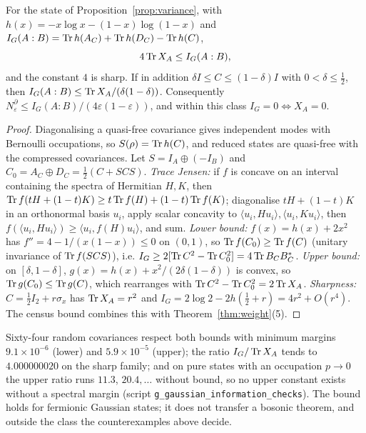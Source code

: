 \begin{theorem}\label{thm:info}
For the state of Proposition~\ref{prop:variance}, with $h(x)=-x\log x-(1-x)\log(1-x)$ and $I_G(A:B)=\operatorname{Tr} h(A_C)+\operatorname{Tr} h(D_C)-\operatorname{Tr} h(C)$,
\[
4\operatorname{Tr} X_A\le I_G(A:B),
\]
and the constant $4$ is sharp. If in addition $\delta I\le C\le(1-\delta)I$ with $0<\delta\le\tfrac12$, then $I_G(A:B)\le\operatorname{Tr} X_A/(\delta(1-\delta))$. Consequently $N^\partial_\varepsilon\le I_G(A:B)/(4\varepsilon(1-\varepsilon))$, and within this class $I_G=0\iff X_A=0$. 
\end{theorem}
\begin{proof}
Diagonalising a quasi-free covariance gives independent modes with Bernoulli occupations, so $S(\rho)=\operatorname{Tr} h(C)$, and reduced states are quasi-free with the compressed covariances. Let $S=I_A\oplus(-I_B)$ and $C_0=A_C\oplus D_C=\tfrac12(C+SCS)$. \emph{Trace Jensen:} if $f$ is concave on an interval containing the spectra of Hermitian $H,K$, then $\operatorname{Tr} f(tH+(1-t)K)\ge t\operatorname{Tr} f(H)+(1-t)\operatorname{Tr} f(K)$; diagonalise $tH+(1-t)K$ in an orthonormal basis $u_i$, apply scalar concavity to $\langle u_i,Hu_i\rangle,\langle u_i,Ku_i\rangle$, then $f(\langle u_i,Hu_i\rangle)\ge\langle u_i,f(H)u_i\rangle$, and sum. \emph{Lower bound:} $f(x)=h(x)+2x^2$ has $f''=4-1/(x(1-x))\le0$ on $(0,1)$, so $\operatorname{Tr} f(C_0)\ge\operatorname{Tr} f(C)$ (unitary invariance of $\operatorname{Tr} f(SCS)$), i.e. $I_G\ge2[\operatorname{Tr} C^2-\operatorname{Tr} C_0^2]=4\operatorname{Tr} B_CB_C^*$. \emph{Upper bound:} on $[\delta,1-\delta]$, $g(x)=h(x)+x^2/(2\delta(1-\delta))$ is convex, so $\operatorname{Tr} g(C_0)\le\operatorname{Tr} g(C)$, which rearranges with $\operatorname{Tr} C^2-\operatorname{Tr} C_0^2=2\operatorname{Tr} X_A$. \emph{Sharpness:} $C=\tfrac12I_2+r\sigma_x$ has $\operatorname{Tr} X_A=r^2$ and $I_G=2\log2-2h(\tfrac12+r)=4r^2+O(r^4)$. The census bound combines this with Theorem~\ref{thm:weight}(5).
\end{proof}
Sixty-four random covariances respect both bounds with minimum margins $9.1\times10^{-6}$ (lower) and $5.9\times10^{-5}$ (upper); the ratio $I_G/\operatorname{Tr} X_A$ tends to $4.000000020$ on the sharp family; and on pure states with an occupation $p\to0$ the upper ratio runs $11.3$, $20.4,\dots$ without bound, so no upper constant exists without a spectral margin  (script \texttt{g\_gaussian\_information\_checks}). The bound holds for fermionic Gaussian states; it does not transfer a bosonic theorem, and outside the class the counterexamples above decide.

